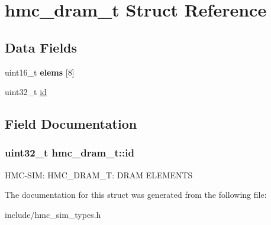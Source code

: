 \hypertarget{structhmc__dram__t}{\section{hmc\-\_\-dram\-\_\-t Struct Reference}
\label{structhmc__dram__t}
}
\subsection*{Data Fields}
\begin{DoxyCompactItemize}
\item 
\hypertarget{structhmc__dram__t_adbe84c36d2347e4f4e68cb7fa2548f64}{uint16\-\_\-t {\bfseries elems} \mbox{[}8\mbox{]}}\label{structhmc__dram__t_adbe84c36d2347e4f4e68cb7fa2548f64}

\item 
uint32\-\_\-t \hyperlink{structhmc__dram__t_ac7cdf085f9db889682674280e498c48f}{id}
\end{DoxyCompactItemize}


\subsection{Field Documentation}
\hypertarget{structhmc__dram__t_ac7cdf085f9db889682674280e498c48f}{
\subsubsection[{id}]{\setlength{\rightskip}{0pt plus 5cm}uint32\-\_\-t hmc\-\_\-dram\-\_\-t\-::id}}\label{structhmc__dram__t_ac7cdf085f9db889682674280e498c48f}
H\-M\-C-\/\-S\-I\-M\-: H\-M\-C\-\_\-\-D\-R\-A\-M\-\_\-\-T\-: D\-R\-A\-M E\-L\-E\-M\-E\-N\-T\-S 

The documentation for this struct was generated from the following file\-:\begin{DoxyCompactItemize}
\item 
include/hmc\-\_\-sim\-\_\-types.\-h\end{DoxyCompactItemize}
